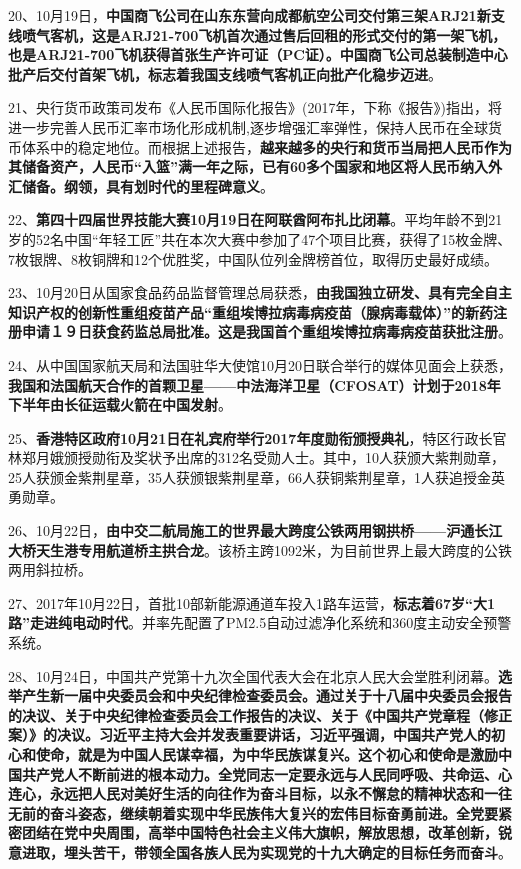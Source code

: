 {{20、10月19日，}\textbf{{中国商飞公司在山东东营向成都航空公司交付第三架ARJ21新支线喷气客机，这是ARJ21-700飞机首次通过售后回租的形式交付的第一架飞机，也是ARJ21-700飞机获得首张生产许可证（PC证）。中国商飞公司总装制造中心批产后交付首架飞机，标志着我国支线喷气客机正向批产化稳步迈进}}{。}}

{{21、}{央行货币政策司发布《人民币国际化报告》(2017年，下称《报告》)指出，将进一步完善人民币汇率市场化形成机制,逐步增强汇率弹性，保持人民币在全球货币体系中的稳定地位。而根据上述报告，}\textbf{{越来越多的央行和货币当局把人民币作为其储备资产，人民币``入篮''满一年之际，已有60多个国家和地区将人民币纳入外汇储备。纲领，具有划时代的里程碑意义}}{。}}

{{22、}}{\textbf{{第四十四届世界技能大赛10月19日在阿联酋阿布扎比闭幕}}{。平均年龄不到21岁的52名中国``年轻工匠''共在本次大赛中参加了47个项目比赛，获得了15枚金牌、7枚银牌、8枚铜牌和12个优胜奖，中国队位列金牌榜首位，取得历史最好成绩。}}

{{23、10月20日从国家食品药品监督管理总局获悉，}\textbf{{由我国独立研发、具有完全自主知识产权的创新性重组疫苗产品``重组埃博拉病毒病疫苗（腺病毒载体）''的新药注册申请１９日获食药监总局批准。这是我国首个重组埃博拉病毒病疫苗获批注册}}{。}}

{{24、从中国国家航天局和法国驻华大使馆10月20日联合举行的媒体见面会上获悉，}\textbf{{我国和法国航天合作的首颗卫星------中法海洋卫星（CFOSAT）计划于2018年下半年由长征运载火箭在中国发射}}{。}}

{{25、}\textbf{{香港特区政府10月21日在礼宾府举行2017年度勋衔颁授典礼}}{，特区行政长官林郑月娥颁授勋衔及奖状予出席的312名受勋人士。其中，10人获颁大紫荆勋章，25人获颁金紫荆星章，35人获颁银紫荆星章，66人获铜紫荆星章，1人获追授金英勇勋章。}}

{{26、10月22日，}\textbf{{由中交二航局施工的世界最大跨度公铁两用钢拱桥------沪通长江大桥天生港专用航道桥主拱合龙}}{。该桥主跨1092米，为目前世界上最大跨度的公铁两用斜拉桥。}}

{{27、2017年10月22日，首批10部新能源通道车投入1路车运营，}\textbf{{标志着67岁``大1路''走进纯电动时代}}{。并率先配置了PM2.5自动过滤净化系统和360度主动安全预警系统。}}

{{28、10月24日，中国共产党第十九次全国代表大会在北京人民大会堂胜利闭幕。}\textbf{{选举产生新一届中央委员会和中央纪律检查委员会。通过关于十八届中央委员会报告的决议、关于中央纪律检查委员会工作报告的决议、关于《中国共产党章程（修正案）》的决议。习近平主持大会并发表重要讲话，习近平强调，中国共产党人的初心和使命，就是为中国人民谋幸福，为中华民族谋复兴。这个初心和使命是激励中国共产党人不断前进的根本动力。全党同志一定要永远与人民同呼吸、共命运、心连心，永远把人民对美好生活的向往作为奋斗目标，以永不懈怠的精神状态和一往无前的奋斗姿态，继续朝着实现中华民族伟大复兴的宏伟目标奋勇前进。全党要紧密团结在党中央周围，高举中国特色社会主义伟大旗帜，解放思想，改革创新，锐意进取，埋头苦干，带领全国各族人民为实现党的十九大确定的目标任务而奋斗}}{。}}

